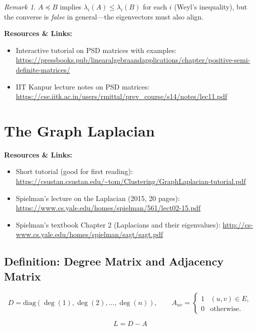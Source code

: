 \documentclass[12pt]{article}
\theoremstyle{definition}
\theoremstyle{remark}
\newtheorem{remark}[theorem]{Remark}
\newcommand{\resources}[1]{%
  \vspace{4pt}
  \noindent\colorbox{blue!8}{\parbox{\dimexpr\linewidth-2\fboxsep}{%
    \small\textbf{Resources \& Links:} #1}}
  \vspace{4pt}
}
\begin{document}
\begin{remark}
$A \preceq B$ implies $\lambda_i(A) \le \lambda_i(B)$ for each $i$ (Weyl's inequality),
but the converse is \emph{false} in general---the eigenvectors must also align.
\end{remark}

\resources{
\begin{itemize}\setlength\itemsep{0pt}
  \item Interactive tutorial on PSD matrices with examples:
        \url{https://pressbooks.pub/linearalgebraandapplications/chapter/positive-semi-definite-matrices/}
  \item IIT Kanpur lecture notes on PSD matrices:
        \url{https://cse.iitk.ac.in/users/rmittal/prev_course/s14/notes/lec11.pdf}
\end{itemize}
}

\section{The Graph Laplacian}
\label{sec:laplacian}

\resources{
\begin{itemize}\setlength\itemsep{0pt}
  \item Short tutorial (good for first reading):
        \url{https://csustan.csustan.edu/~tom/Clustering/GraphLaplacian-tutorial.pdf}
  \item Spielman's lecture on the Laplacian (2015, 20 pages):
        \url{https://www.cs.yale.edu/homes/spielman/561/lect02-15.pdf}
  \item Spielman's textbook Chapter 2 (Laplacians and their eigenvalues):
        \url{http://cs-www.cs.yale.edu/homes/spielman/sagt/sagt.pdf}
\end{itemize}
}

\subsection{Definition: Degree Matrix and Adjacency Matrix}

\[
  D = \mathrm{diag}(\deg(1), \deg(2), \ldots, \deg(n)), \qquad
  A_{uv} = \begin{cases}1 & (u,v)\in E,\\ 0 & \text{otherwise.}\end{cases}
\]

\[
  \boxed{L = D - A}
\]
\end{document}
